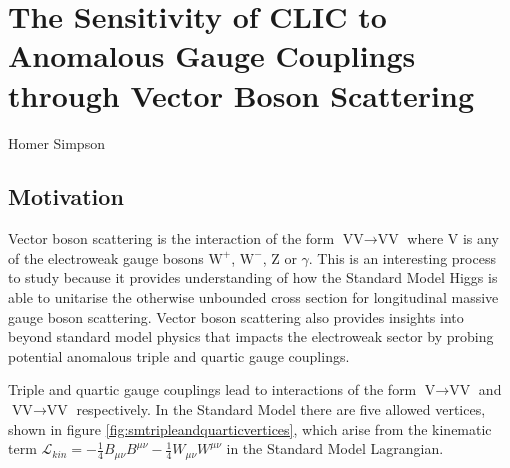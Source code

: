 \chapter{The Sensitivity of CLIC to Anomalous Gauge Couplings through Vector Boson Scattering}
\label{chap:PhysicsAnalysis}

%
{Homer Simpson}


\section{Motivation}
Vector boson scattering is the interaction of the form $\text{VV} \rightarrow \text{VV}$ where V is any of the electroweak gauge bosons $\text{W}^{+}$, $\text{W}^{-}$, Z or $\gamma$.  This is an interesting process to study because it provides understanding of how the Standard Model Higgs is able to unitarise the otherwise unbounded cross section for longitudinal massive gauge boson scattering.  Vector boson scattering also provides insights into beyond standard model physics that impacts the electroweak sector by probing potential anomalous triple and quartic gauge couplings.  

Triple and quartic gauge couplings lead to interactions of the form $\text{V} \rightarrow \text{VV}$ and $\text{VV} \rightarrow \text{VV}$ respectively.  In the Standard Model there are five allowed vertices, shown in figure \ref{fig:smtripleandquarticvertices}, which arise from the kinematic term $\mathcal{L}_{kin} = -\frac{1}{4}B_{\mu\nu}B^{\mu\nu} - \frac{1}{4}W_{\mu\nu}W^{\mu\nu}$ in the Standard Model Lagrangian.

